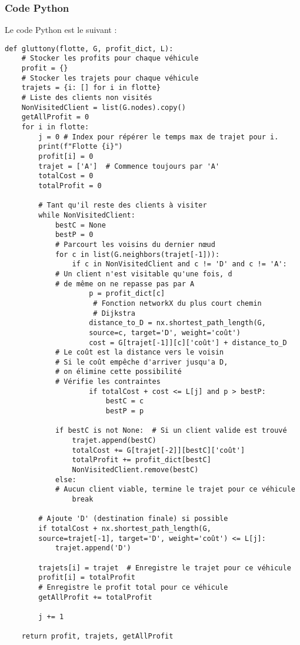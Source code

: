\documentclass[a4paper, 12pt, DIV=12]{scrartcl}
\begin{document}
\subsubsection{Code Python}
Le code Python est le suivant : 
\begin{verbatim}
def gluttony(flotte, G, profit_dict, L):
    # Stocker les profits pour chaque véhicule
    profit = {} 
    # Stocker les trajets pour chaque véhicule
    trajets = {i: [] for i in flotte}  
    # Liste des clients non visités
    NonVisitedClient = list(G.nodes).copy() 
    getAllProfit = 0
    for i in flotte:
        j = 0 # Index pour répérer le temps max de trajet pour i.
        print(f"Flotte {i}")
        profit[i] = 0
        trajet = ['A']  # Commence toujours par 'A'
        totalCost = 0
        totalProfit = 0

        # Tant qu'il reste des clients à visiter
        while NonVisitedClient:  
            bestC = None
            bestP = 0
            # Parcourt les voisins du dernier nœud
            for c in list(G.neighbors(trajet[-1])):  
                if c in NonVisitedClient and c != 'D' and c != 'A':  
            # Un client n'est visitable qu'une fois, d
            # de même on ne repasse pas par A
                    p = profit_dict[c]
                     # Fonction networkX du plus court chemin
                     # Dijkstra
                    distance_to_D = nx.shortest_path_length(G, 
                    source=c, target='D', weight='coût')
                    cost = G[trajet[-1]][c]['coût'] + distance_to_D 
            # Le coût est la distance vers le voisin
            # Si le coût empêche d'arriver jusqu'a D,
            # on élimine cette possibilité
            # Vérifie les contraintes
                    if totalCost + cost <= L[j] and p > bestP:  
                        bestC = c
                        bestP = p

            if bestC is not None:  # Si un client valide est trouvé
                trajet.append(bestC)
                totalCost += G[trajet[-2]][bestC]['coût']
                totalProfit += profit_dict[bestC]
                NonVisitedClient.remove(bestC)
            else:
            # Aucun client viable, termine le trajet pour ce véhicule
                break

        # Ajoute 'D' (destination finale) si possible
        if totalCost + nx.shortest_path_length(G, 
        source=trajet[-1], target='D', weight='coût') <= L[j]:
            trajet.append('D')

        trajets[i] = trajet  # Enregistre le trajet pour ce véhicule
        profit[i] = totalProfit  
        # Enregistre le profit total pour ce véhicule
        getAllProfit += totalProfit
    
        j += 1

    return profit, trajets, getAllProfit
\end{verbatim}
\end{document}
